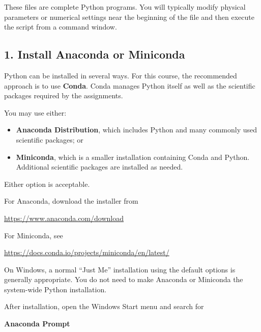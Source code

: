 \documentclass[11pt]{article}
\begin{document}
These files are complete Python programs. You will typically modify
physical parameters or numerical settings near the beginning of the
file and then execute the script from a command window.

\subsection*{1. Install Anaconda or Miniconda}

Python can be installed in several ways. For this course, the recommended
approach is to use \textbf{Conda}. Conda manages Python itself as well as
the scientific packages required by the assignments.

You may use either:

\begin{itemize}
    \item \textbf{Anaconda Distribution}, which includes Python and many
          commonly used scientific packages; or
    \item \textbf{Miniconda}, which is a smaller installation containing
          Conda and Python. Additional scientific packages are installed
          as needed.
\end{itemize}

Either option is acceptable.

For Anaconda, download the installer from

\begin{center}
\href{https://www.anaconda.com/download}
     {https://www.anaconda.com/download}
\end{center}

For Miniconda, see

\begin{center}
\href{https://docs.conda.io/projects/miniconda/en/latest/}
     {https://docs.conda.io/projects/miniconda/en/latest/}
\end{center}

On Windows, a normal ``Just Me'' installation using the default options
is generally appropriate. You do not need to make Anaconda or Miniconda
the system-wide Python installation.

After installation, open the Windows Start menu and search for

\begin{center}
\textbf{Anaconda Prompt}
\end{center}
\end{document}
